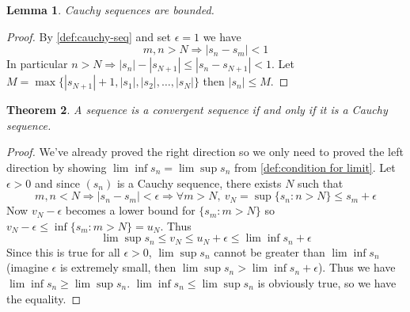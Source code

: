 \documentclass[12pt, lettersize]{book}
\theoremstyle{plain}
\newtheorem{thm}{Theorem}[section]
\newtheorem{lem}[thm]{Lemma}
\theoremstyle{definition}
\theoremstyle{remark}
\begin{document}
		\begin{lem}
		Cauchy sequences are bounded.
		\end{lem}
		\begin{proof}
		By \ref{def:cauchy-seq} and set $\epsilon=1$ we have
		\begin{displaymath}
			m,n>N\Rightarrow|s_n-s_m|<1
		\end{displaymath}
		In particular $n>N\Rightarrow |s_n|-|s_{N+1}|\leq|s_n-s_{N+1}|<1$. Let $M=\max\{|s_{N+1}|+1,|s_1|,|s_2|,\dots,|s_N|\}$ then $|s_n|\leq M$.
		\end{proof}
	
		\begin{thm}\label{def:cauchy iff convergent}
		A sequence is a convergent sequence if and only if it is a Cauchy sequence.
		\end{thm}
		\begin{proof}
		We've already proved the right direction so we only need to proved the left direction by showing $\lim\inf s_n=\lim\sup s_n$ from \ref{def:condition for limit}.
		Let $\epsilon>0$ and since $(s_n)$ is a Cauchy sequence, there exists $N$ such that
		\begin{displaymath}
			m,n<N \Rightarrow |s_n-s_m|<\epsilon\Rightarrow \forall m>N,\ v_N=\sup\{s_n: n>N\}\leq s_m+\epsilon
		\end{displaymath}
		Now $v_N-\epsilon$ becomes a lower bound for $\{s_m: m>N\}$ so $v_N-\epsilon\leq\inf\{s_m: m>N\}=u_N$.
		Thus
		\begin{displaymath}
			\lim\sup s_n\leq v_N\leq u_N+\epsilon\leq\lim\inf s_n+\epsilon
		\end{displaymath}
		Since this is true for all $\epsilon>0$, $\lim\sup s_n$ cannot be greater than $\lim\inf s_n$ (imagine $\epsilon$ is extremely small, then $\lim\sup s_n>\lim\inf s_n+\epsilon$). Thus we have $\lim\inf s_n\geq\lim\sup s_n$. $\lim\inf s_n\leq\lim\sup s_n$ is obviously true, so we have the equality.
		\end{proof}
		\newpage
		
\end{document}

